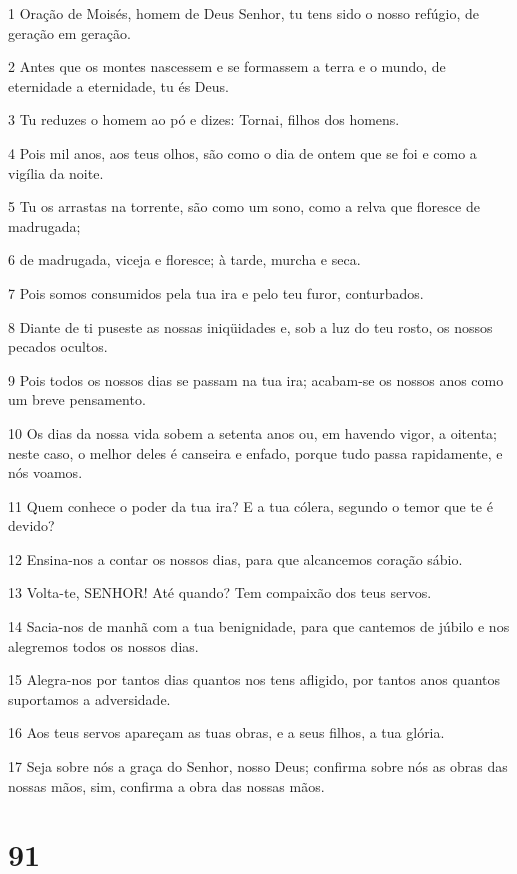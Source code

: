 \par 1 Oração de Moisés, homem de Deus Senhor, tu tens sido o nosso refúgio, de geração em geração.
\par 2 Antes que os montes nascessem e se formassem a terra e o mundo, de eternidade a eternidade, tu és Deus.
\par 3 Tu reduzes o homem ao pó e dizes: Tornai, filhos dos homens.
\par 4 Pois mil anos, aos teus olhos, são como o dia de ontem que se foi e como a vigília da noite.
\par 5 Tu os arrastas na torrente, são como um sono, como a relva que floresce de madrugada;
\par 6 de madrugada, viceja e floresce; à tarde, murcha e seca.
\par 7 Pois somos consumidos pela tua ira e pelo teu furor, conturbados.
\par 8 Diante de ti puseste as nossas iniqüidades e, sob a luz do teu rosto, os nossos pecados ocultos.
\par 9 Pois todos os nossos dias se passam na tua ira; acabam-se os nossos anos como um breve pensamento.
\par 10 Os dias da nossa vida sobem a setenta anos ou, em havendo vigor, a oitenta; neste caso, o melhor deles é canseira e enfado, porque tudo passa rapidamente, e nós voamos.
\par 11 Quem conhece o poder da tua ira? E a tua cólera, segundo o temor que te é devido?
\par 12 Ensina-nos a contar os nossos dias, para que alcancemos coração sábio.
\par 13 Volta-te, SENHOR! Até quando? Tem compaixão dos teus servos.
\par 14 Sacia-nos de manhã com a tua benignidade, para que cantemos de júbilo e nos alegremos todos os nossos dias.
\par 15 Alegra-nos por tantos dias quantos nos tens afligido, por tantos anos quantos suportamos a adversidade.
\par 16 Aos teus servos apareçam as tuas obras, e a seus filhos, a tua glória.
\par 17 Seja sobre nós a graça do Senhor, nosso Deus; confirma sobre nós as obras das nossas mãos, sim, confirma a obra das nossas mãos.

\chapter{91}

